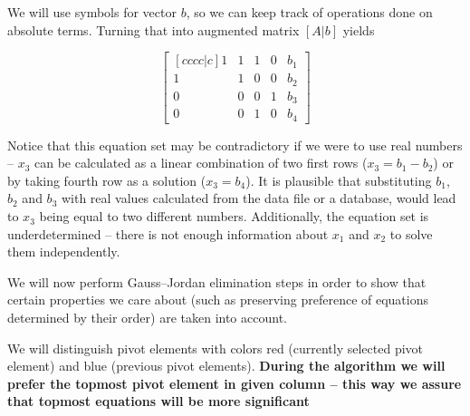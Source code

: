 We will use symbols for vector \textbf{$b$}, so we can keep track of operations done on absolute terms.
Turning that into augmented matrix $[A|b]$ yields

\begin{equation}
\begin{bmatrix}[cccc|c]
    1 & 1 & 1 & 0 & b_1 \\ 
    1 & 1 & 0 & 0 & b_2 \\ 
    0 & 0 & 0 & 1 & b_3 \\ 
    0 & 0 & 1 & 0 & b_4
\end{bmatrix}
\end{equation}

Notice that this equation set may be contradictory if we were to use real numbers -- $x_3$ can be calculated as a linear combination of two first rows ($x_3 = b_1 - b_2$) or by taking fourth row as a solution ($x_3 = b_4$).
It is plausible that substituting $b_1$, $b_2$ and $b_3$ with real values calculated from the data file or a database, would lead to $x_3$ being equal to two different numbers.
Additionally, the equation set is underdetermined -- there is not enough information about $x_1$ and $x_2$ to solve them independently.

We will now perform Gauss--Jordan elimination steps in order to show that certain properties we care about (such as preserving preference of equations determined by their order) are taken into account.

We will distinguish pivot elements with colors red (currently selected pivot element) and blue (previous pivot elements).
\textbf{During the algorithm we will prefer the topmost pivot element in given column -- this way we assure that topmost equations will be more significant}


